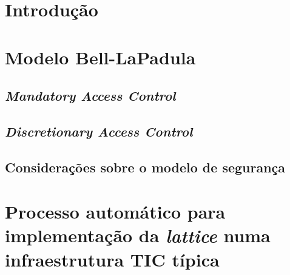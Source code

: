 \documentclass[12pt,a4paper,table]{report}
\begin{document}
 



{
\tableofcontents
{}
}

{
\let\origaddvspace\addvspace
 \renewcommand{\addvspace}[1]{}
 \listoffigures
 }
 
\chapter{Introdução}


\chapter{Modelo Bell-LaPadula}


\section{\textit{Mandatory Access Control}}


\section{\textit{Discretionary Access Control}}


\section{Considerações sobre o modelo de segurança}


\chapter{Processo automático para implementação da \textit{lattice} numa infraestrutura TIC típica}


\restoregeometry
\end{document}
